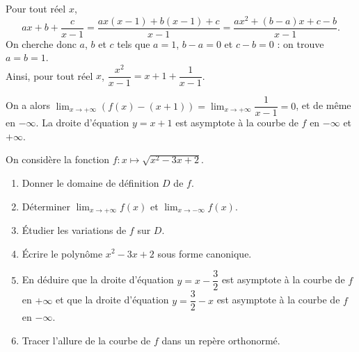 \documentclass[11pt,fleqn, openany]{book} %
\begin{document}
\begin{solution}Pour tout réel $x$, 
\[ax+b+\dfrac{c}{x-1}=\dfrac{ax(x-1)+b(x-1)+c}{x-1}=\dfrac{ax^2+(b-a)x+c-b}{x-1}.\]
On cherche donc $a$, $b$ et $c$ tels que $a=1$, $b-a=0$ et $c-b=0$ : on trouve $a=b=1$.\\ Ainsi, pour tout réel $x$, $\dfrac{x^2}{x-1}=x+1+\dfrac{1}{x-1}$.

On a alors $\displaystyle\lim_{x\to +\infty}(f(x)-(x+1))=\displaystyle\lim_{x\to +\infty}\dfrac{1}{x-1}=0$, et de même en $-\infty$. La droite d'équation $y=x+1$ est asymptote à la courbe de $f$ en $-\infty$ et $+\infty$.\end{solution}




\begin{exercise}[topic=lim24]On considère la fonction $f : x\mapsto \sqrt{x^2-3x+2}$.
\begin{enumerate}
\item Donner le domaine de définition $D$ de $f$.
\item Déterminer $\displaystyle \lim_{x \to +\infty} f(x)$ et $\displaystyle \lim_{x \to -\infty} f(x)$.
\item Étudier les variations de $f$ sur $D$.
\item Écrire le polynôme $x^2-3x+2$ sous forme canonique.
\item En déduire que la droite d'équation $y=x-\dfrac{3}{2}$ est asymptote à la courbe de $f$ en $+\infty$ et que la droite d'équation $y=\dfrac{3}{2}-x$ est asymptote à la courbe de $f$ en $-\infty$.
\item Tracer l'allure de la courbe de $f$ dans un repère orthonormé.
\end{enumerate}\newpage \end{exercise}
\end{document}
